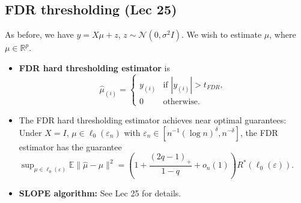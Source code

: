 \documentclass[twoside]{article}
\newcommand\bbE{\mathbb{E}}
\newcommand\bbR{\mathbb{R}}
\newcommand\calN{\mathcal{N}}
\newcommand\dlt{\delta}
\def\eps{\varepsilon}
\newcommand\sg{\sigma}
\begin{document}
\subsection{FDR thresholding (Lec 25)}
As before, we have $y = X\mu + z$, $z \sim \calN(0, \sg^2I)$. We wish to estimate $\mu$, where $\mu \in \bbR^p$.
\begin{itemize}
\item \textbf{FDR hard thresholding estimator} is
\[ \hat{\mu}_{(i)} = \begin{cases} y_{(i)} &\text{if } |y_{(i)}| > t_{FDR}, \\ 0 &\text{otherwise.} \end{cases} \]

\item The FDR hard thresholding estimator achieves near optimal guarantees: Under $X = I$, $\mu \in \ell_0(\eps_n)$ with $\eps_n \in \left[ n^{-1}(\log n)^\dlt, n^{-\dlt} \right]$, the FDR estimator has the guarantee $\sup_{\mu \in \ell_0(\eps)} \bbE \|\hat{\mu} - \mu\|^2 = \left( 1 + \dfrac{(2q-1)_+}{1-q} + o_n(1) \right)R^*(\ell_0(\eps))$.

\item \textbf{SLOPE algorithm:} See Lec 25 for details.

\end{itemize}
\end{document}
